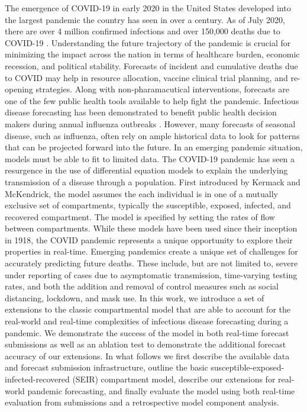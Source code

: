 \documentclass[11pt]{amsart}
\begin{document}
The emergence of COVID-19 in early 2020 in the United States developed into the largest pandemic the country has seen in over a century. As of July 2020, there are over 4 million confirmed infections and over 150,000 deaths due to COVID-19 \cite{dong2020interactive}.  Understanding the future trajectory of the pandemic is crucial for minimizing the impact across the nation in terms of healthcare burden, economic recession, and political stability. Forecasts of incident and cumulative deaths due to COVID may help in resource allocation, vaccine clinical trial planning, and re-opening strategies. Along with non-pharamacutical interventions, forecasts are one of the few public health tools available to help fight the pandemic. Infectious disease forecasting has been demonstrated to benefit public health decision makers during annual influenza outbreaks \cite{lutz2019applying}.  However, many forecasts of seasonal disease, such as influenza, often rely on ample historical data to look for patterns that can be projected forward into the future. In an emerging pandemic situation, models must be able to fit to limited data. The COVID-19 pandemic has seen a resurgence in the use of differential equation models to explain the underlying transmission of a disease through a population. First introduced by  Kermack and McKendrick, the model assumes the each individual is in one of a mutually exclusive set of compartments, typically the susceptible, exposed, infected, and recovered compartment. The model is specified by setting the rates of flow between compartments. While these models have been used since their inception in 1918, the COVID pandemic represents a unique opportunity to explore their properties in real-time. Emerging pandemics create a unique set of challenges for accurately predicting future deaths. These include, but are not limited to, severe under reporting of cases due to asymptomatic transmission, time-varying testing rates, and both the addition and removal of control measures such as social distancing, lockdown, and mask use. In this work, we introduce a set of extensions to the classic compartmental model that are able to account for the real-world and real-time complexities of infectious disease forecasting during a pandemic. We demonstrate the success of the model in both real-time forecast submissions  as well as an ablation test to demonstrate the additional forecast accuracy of our extensions. In what follows we first describe the available data and forecast submission infrastructure, outline the basic susceptible-exposed-infected-recovered (SEIR) compartment model, describe our extensions for real-world pandemic forecasting, and finally evaluate the model using both real-time evaluation from submissions and a retrospective model component analysis. 
\end{document}
